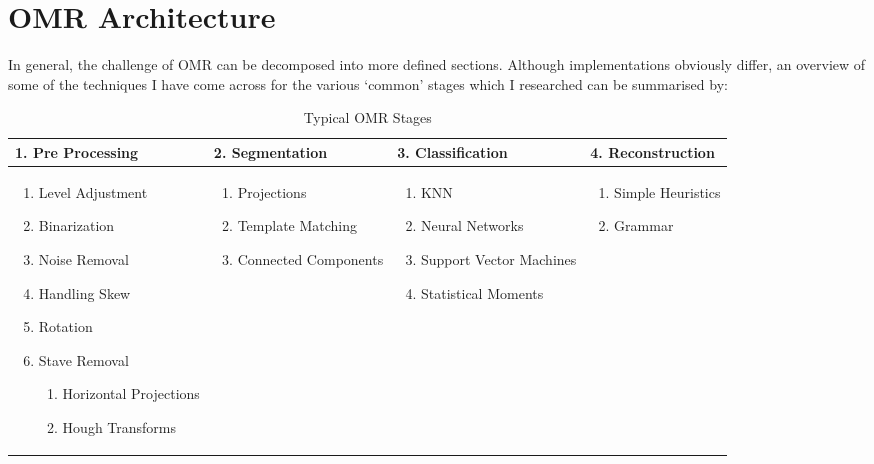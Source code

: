 \section{OMR Architecture}

In general, the challenge of OMR can be decomposed into more defined sections. Although implementations obviously differ, an overview of some of the techniques I have come across for the various `common' stages which I researched can be summarised by:

\begin{table}[H]
  \footnotesize
  \begin{tabularx}{\linewidth}{ X X X X }
    \toprule
    \textbf{1. Pre Processing} & \textbf{2. Segmentation} & \textbf{3. Classification} &  \textbf{4. Reconstruction} \\
    \midrule

    \begin{enumerate}[leftmargin=*]
      \item Level Adjustment
      \item Binarization
      \item Noise Removal
      \item Handling Skew
      \item Rotation
      \item Stave Removal
        \begin{enumerate}
          \item Horizontal Projections
          \item Hough Transforms
        \end{enumerate}
    \end{enumerate}

    &

    \begin{enumerate}[leftmargin=*]
      \item Projections
      \item Template Matching
      \item Connected Components
    \end{enumerate}

    &

    \begin{enumerate}[leftmargin=*]
      \item \acrfull{KNN}
      \item Neural Networks
      \item Support Vector Machines
      \item Statistical Moments
    \end{enumerate}

    &

    \begin{enumerate}[leftmargin=*]
      \item Simple Heuristics
      \item Grammar
    \end{enumerate} \\
    \bottomrule
  \end{tabularx}

  \caption{Typical OMR Stages}
  \label{table:omr-stages-typical}
\end{table}
